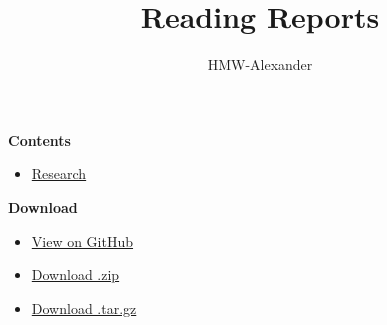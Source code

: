 \documentclass[letterpaper,11pt]{article}
\title{\textbf{Reading Reports}}
\author{HMW-Alexander}
\begin{document}
\maketitle

\textbf{Contents}
\begin{itemize}
	\item \href{./Research/index.html}{Research}
\end{itemize}

\textbf{Download}
\begin{itemize}
	\item \href{https://github.com/MengwenHe-CMU/Reading-Reports}{View on GitHub}
	\item \href{https://github.com/MengwenHe-CMU/Reading-Reports/zipball/master}{Download .zip}
	\item \href{https://github.com/MengwenHe-CMU/Reading-Reports/tarball/master}{Download .tar.gz}
\end{itemize}
	
\end{document}
